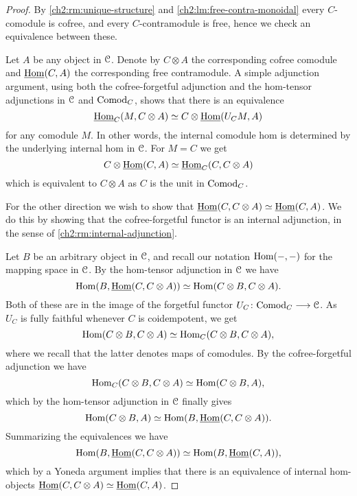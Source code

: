 \begin{proof}
    By \cref{ch2:rm:unique-structure} and \cref{ch2:lm:free-contra-monoidal} every $C$-comodule is cofree, and every $C$-contramodule is free, hence we check an equivalence between these. 
    
    Let $A$ be any object in $\EuScript{C}$. Denote by $C\otimes A$ the corresponding cofree comodule and $\operatorname{\underline{Hom}}(C, A)$ the corresponding free contramodule. A simple adjunction argument, using both the cofree-forgetful adjunction and the hom-tensor adjunctions in $\EuScript{C}$ and $\mathrm{Comod}_C$, shows that there is an equivalence 
    \[\operatorname{\underline{Hom}}_C(M, C\otimes A)\simeq C\otimes \operatorname{\underline{Hom}}(U_C M, A)\]
    for any comodule $M$. In other words, the internal comodule hom is determined by the underlying internal hom in $\EuScript{C}$. For $M = C$ we get
    \[C\otimes \operatorname{\underline{Hom}}(C, A)\simeq \operatorname{\underline{Hom}}_C(C, C\otimes A)\]
    which is equivalent to $C\otimes A$ as $C$ is the unit in $\mathrm{Comod}_C$. 

    For the other direction we wish to show that $\operatorname{\underline{Hom}}(C, C\otimes A) \simeq \operatorname{\underline{Hom}}(C, A)$. We do this by showing that the cofree-forgetful functor is an internal adjunction, in the sense of \cref{ch2:rm:internal-adjunction}. 

    Let $B$ be an arbitrary object in $\EuScript{C}$, and recall our notation $\operatorname{Hom}(-,-)$ for the mapping space in $\EuScript{C}$. By the hom-tensor adjunction in $\EuScript{C}$ we have 
    \[\operatorname{Hom}(B, \operatorname{\underline{Hom}}(C, C\otimes A)) \simeq \operatorname{Hom}(C\otimes B, C\otimes A).\]
    Both of these are in the image of the forgetful functor $U_C\colon\mathrm{Comod}_C\longrightarrow \EuScript{C}$. As $U_C$ is fully faithful whenever $C$ is coidempotent, we get 
    \[\operatorname{Hom}(C\otimes B, C\otimes A) \simeq \operatorname{Hom}_C(C\otimes B, C\otimes A),\]
    where we recall that the latter denotes maps of comodules. By the cofree-forgetful adjunction we have 
    \[\operatorname{Hom}_C(C\otimes B, C\otimes A) \simeq \operatorname{Hom}(C\otimes B, A),\]
    which by the hom-tensor adjunction in $\EuScript{C}$ finally gives 
    \[\operatorname{Hom}(C\otimes B, A) \simeq \operatorname{Hom}(B, \operatorname{\underline{Hom}}(C, C\otimes A)).\]
    Summarizing the equivalences we have 
    \[\operatorname{Hom}(B, \operatorname{\underline{Hom}}(C, C\otimes A))\simeq \operatorname{Hom}(B, \operatorname{\underline{Hom}}(C, A)),\] 
    which by a Yoneda argument implies that there is an equivalence of internal hom-objects $\operatorname{\underline{Hom}}(C, C\otimes A)\simeq \operatorname{\underline{Hom}}(C, A)$. 



\end{proof}
